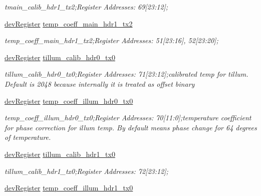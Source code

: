 \begin{DoxyCompactItemize}
\begin{DoxyCompactList}\small\item\em tmain\+\_\+calib\+\_\+hdr1\+\_\+tx2;Register Addresses\+: 69\mbox{[}23\+:12\mbox{]}; \end{DoxyCompactList}\item 
\mbox{\hyperlink{classdev_register}{dev\+Register}} \mbox{\hyperlink{class_o_p_t3101_registers_aedf7f8cd84bf5cf762b213cb18517c6d}{temp\+\_\+coeff\+\_\+main\+\_\+hdr1\+\_\+tx2}}
\begin{DoxyCompactList}\small\item\em temp\+\_\+coeff\+\_\+main\+\_\+hdr1\+\_\+tx2;Register Addresses\+: 51\mbox{[}23\+:16\mbox{]}, 52\mbox{[}23\+:20\mbox{]}; \end{DoxyCompactList}\item 
\mbox{\hyperlink{classdev_register}{dev\+Register}} \mbox{\hyperlink{class_o_p_t3101_registers_a142745da9e41edd3c1440f3af3e65e98}{tillum\+\_\+calib\+\_\+hdr0\+\_\+tx0}}
\begin{DoxyCompactList}\small\item\em tillum\+\_\+calib\+\_\+hdr0\+\_\+tx0;Register Addresses\+: 71\mbox{[}23\+:12\mbox{]};calibrated temp for tillum. Default is 2048 because internally it is treated as offset binary \end{DoxyCompactList}\item 
\mbox{\hyperlink{classdev_register}{dev\+Register}} \mbox{\hyperlink{class_o_p_t3101_registers_a02450b3a7e704a15f237daaeb6c7e1a9}{temp\+\_\+coeff\+\_\+illum\+\_\+hdr0\+\_\+tx0}}
\begin{DoxyCompactList}\small\item\em temp\+\_\+coeff\+\_\+illum\+\_\+hdr0\+\_\+tx0;Register Addresses\+: 70\mbox{[}11\+:0\mbox{]};temperature coefficient for phase correction for illum temp. By default means phase change for 64 degrees of temperature. \end{DoxyCompactList}\item 
\mbox{\hyperlink{classdev_register}{dev\+Register}} \mbox{\hyperlink{class_o_p_t3101_registers_ad15ed33a8a3113a30edd4177b2404d31}{tillum\+\_\+calib\+\_\+hdr1\+\_\+tx0}}
\begin{DoxyCompactList}\small\item\em tillum\+\_\+calib\+\_\+hdr1\+\_\+tx0;Register Addresses\+: 72\mbox{[}23\+:12\mbox{]}; \end{DoxyCompactList}\item 
\mbox{\hyperlink{classdev_register}{dev\+Register}} \mbox{\hyperlink{class_o_p_t3101_registers_ab480d0b32c1030304fc88be7bce233b5}{temp\+\_\+coeff\+\_\+illum\+\_\+hdr1\+\_\+tx0}}

\end{DoxyCompactItemize}
